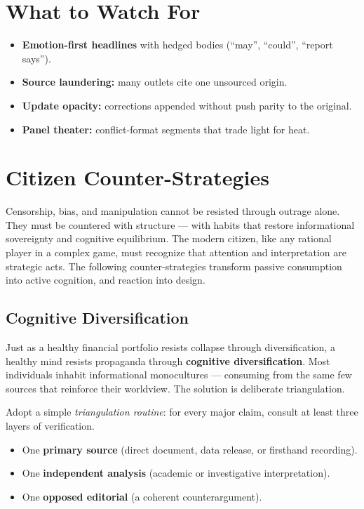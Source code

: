 \documentclass[12pt,twoside]{book}
\begin{document}
\section{What to Watch For}
\begin{itemize}
  \item \textbf{Emotion-first headlines} with hedged bodies (“may”, “could”, “report says”).
  \item \textbf{Source laundering:} many outlets cite one unsourced origin.
  \item \textbf{Update opacity:} corrections appended without push parity to the original.
  \item \textbf{Panel theater:} conflict-format segments that trade light for heat.
\end{itemize}

\section{Citizen Counter-Strategies}

Censorship, bias, and manipulation cannot be resisted through outrage alone.  
They must be countered with structure --- with habits that restore informational sovereignty and cognitive equilibrium.  
The modern citizen, like any rational player in a complex game, must recognize that attention and interpretation are strategic acts.  
The following counter-strategies transform passive consumption into active cognition, and reaction into design.

\subsection*{Cognitive Diversification}

Just as a healthy financial portfolio resists collapse through diversification, a healthy mind resists propaganda through \textbf{cognitive diversification}.  
Most individuals inhabit informational monocultures --- consuming from the same few sources that reinforce their worldview.  
The solution is deliberate triangulation.

Adopt a simple \emph{triangulation routine}: for every major claim, consult at least three layers of verification.  
\begin{itemize}
  \item One \textbf{primary source} (direct document, data release, or firsthand recording).  
  \item One \textbf{independent analysis} (academic or investigative interpretation).  
  \item One \textbf{opposed editorial} (a coherent counterargument).  
\end{itemize}
\end{document}
